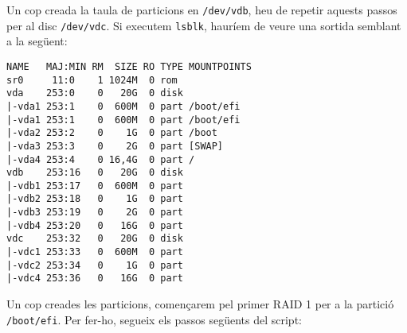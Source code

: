 Un cop creada la taula de particions en  \texttt{/dev/vdb}, heu de repetir aquests passos per al disc \texttt{/dev/vdc}.
Si executem \texttt{lsblk}, hauríem de veure una sortida semblant a la següent:

\begin{terminaloutput}
\footnotesize\begin{verbatim}
NAME   MAJ:MIN RM  SIZE RO TYPE MOUNTPOINTS
sr0     11:0    1 1024M  0 rom
vda    253:0    0   20G  0 disk
|-vda1 253:1    0  600M  0 part /boot/efi
|-vda1 253:1    0  600M  0 part /boot/efi
|-vda2 253:2    0    1G  0 part /boot
|-vda3 253:3    0    2G  0 part [SWAP]
|-vda4 253:4    0 16,4G  0 part /
vdb    253:16   0   20G  0 disk
|-vdb1 253:17   0  600M  0 part
|-vdb2 253:18   0    1G  0 part
|-vdb3 253:19   0    2G  0 part
|-vdb4 253:20   0   16G  0 part
vdc    253:32   0   20G  0 disk
|-vdc1 253:33   0  600M  0 part
|-vdc2 253:34   0    1G  0 part
|-vdc4 253:36   0   16G  0 part
\end{verbatim}
\end{terminaloutput}
                
Un cop creades les particions, començarem pel primer RAID 1 per a la partició \texttt{/boot/efi}. Per fer-ho, segueix els passos següents del script:

